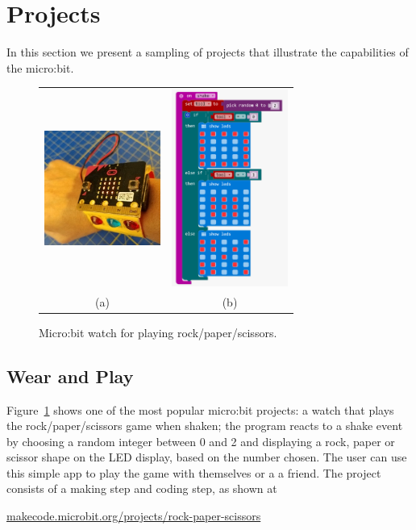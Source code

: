 \section{Projects}
\label{sec:}

In this section we present a sampling of projects that 
illustrate the capabilities of the micro:bit. 

\begin{figure}[t] 
    \begin{tabular}{cc}
        \includegraphics[width=1.5in]{images/rock-paper-scissors.jpg}  &
        \includegraphics[width=1.5in]{images/rpsBlocks.png} \\
        (a) & (b) 
      \end{tabular}
    \caption{\label{fig:rps}Micro:bit watch for playing rock/paper/scissors.}
\end{figure}

\subsection{Wear and Play}

Figure~\ref{fig:rps} shows one of the most popular micro:bit projects:
a watch that plays the rock/paper/scissors game when shaken; 
the program reacts to a shake event by choosing a random integer between 0 and 2
and displaying a rock, paper or scissor shape on the LED display, based
on the number chosen. The
user can use this simple app to play the game with themselves or a
a friend. The project consists of a making step and coding step,
as shown at
\begin{center}
\small{\url{makecode.microbit.org/projects/rock-paper-scissors}}
\end{center}

